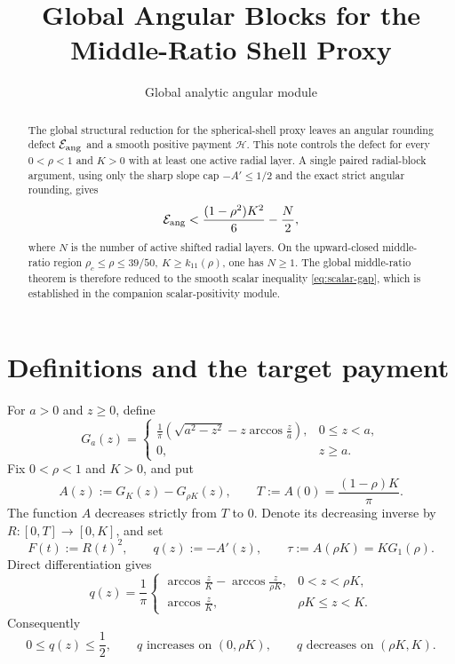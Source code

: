 \documentclass[11pt]{article}
\title{Global Angular Blocks for the Middle-Ratio Shell Proxy}
\author{}
\date{Global analytic angular module}
\theoremstyle{remark}
\begin{document}
\maketitle

\begin{abstract}
The global structural reduction for the spherical-shell proxy leaves an
angular rounding defect $\mathcal E_{\rm ang}$ and a smooth positive payment
$\mathcal H$.  This note controls the defect for every $0<\rho<1$ and $K>0$
with at least one active radial layer.  A single paired radial-block argument,
using only the sharp slope cap $-A'\leq1/2$ and the exact strict angular
rounding, gives
\[
 \mathcal E_{\rm ang}
 <\frac{(1-\rho^2)K^2}{6}-\frac N2,
\]
where $N$ is the number of active shifted radial layers.  On the
upward-closed middle-ratio region
\(
 \rho_c\leq\rho\leq39/50,
 \ K\geq k_{11}(\rho)
\), one has $N\geq1$.  The global middle-ratio theorem is therefore reduced
to the smooth scalar inequality \eqref{eq:scalar-gap}, which is established
in the companion scalar-positivity module.
\end{abstract}

\section{Definitions and the target payment}

For $a>0$ and $z\geq0$, define
\begin{equation}
 G_a(z)=
 \begin{cases}
 \displaystyle\frac1\pi\left(\sqrt{a^2-z^2}
       -z\arccos\frac za\right),&0\leq z<a,\\[4pt]
 0,&z\geq a.
 \end{cases}
 \label{eq:G}
\end{equation}
Fix $0<\rho<1$ and $K>0$, and put
\begin{equation}
 A(z):=G_K(z)-G_{\rho K}(z),
 \qquad
 T:=A(0)=\frac{(1-\rho)K}{\pi}.
 \label{eq:A}
\end{equation}
The function $A$ decreases strictly from $T$ to $0$.  Denote its
decreasing inverse by $R:[0,T]\to[0,K]$, and set
\begin{equation}
 F(t):=R(t)^2,
 \qquad
 q(z):=-A'(z),
 \qquad
 \tau:=A(\rho K)=KG_1(\rho).
 \label{eq:inverse}
\end{equation}
Direct differentiation gives
\begin{equation}
 q(z)=\frac1\pi
 \begin{cases}
 \displaystyle
 \arccos\frac zK-\arccos\frac z{\rho K},&0<z<\rho K,\\[6pt]
 \displaystyle\arccos\frac zK,&\rho K\leq z<K.
 \end{cases}
 \label{eq:q}
\end{equation}
Consequently
\begin{equation}
 0\leq q(z)\leq\frac12,
 \qquad
 q\text{ increases on }(0,\rho K),
 \qquad
 q\text{ decreases on }(\rho K,K).
 \label{eq:q-shape}
\end{equation}
\end{document}
